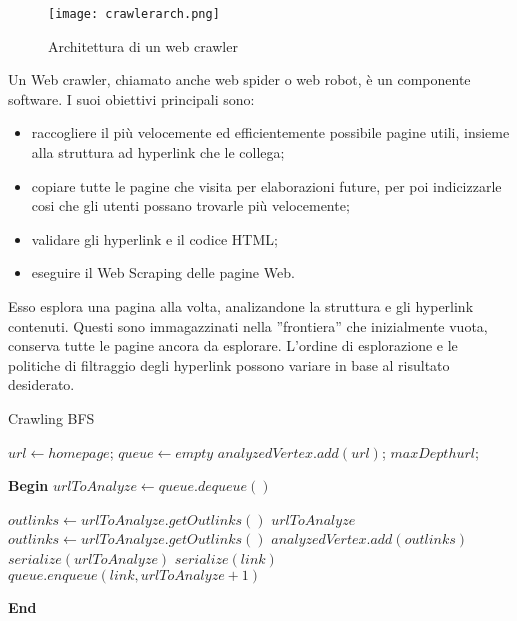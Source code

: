 \begin{figure}[htb]
	\centering
	\texttt{[image: crawlerarch.png]}
	\caption{Architettura di un web crawler}
	\label{crawlerarch}
\end{figure}

Un Web crawler, chiamato anche web spider o web robot, è un componente software. I suoi obiettivi principali sono:
\begin{itemize}
\item raccogliere il più velocemente ed efficientemente possibile pagine utili, insieme alla struttura ad hyperlink che le collega;
\item copiare tutte le pagine che visita per elaborazioni future, per poi indicizzarle cosi che gli utenti possano trovarle più velocemente;
\item validare gli hyperlink e il codice HTML;
\item eseguire il Web Scraping delle pagine Web.
\end{itemize}

Esso esplora una pagina alla volta, analizandone la struttura e gli hyperlink contenuti. Questi sono immagazzinati nella ''frontiera'' che inizialmente vuota, conserva tutte le pagine ancora da esplorare. L'ordine di esplorazione e le politiche di filtraggio degli hyperlink possono variare in base al risultato desiderato. 

\begin{algorithm}[H]
\caption{Crawling BFS}
\begin{algorithmic}

	\State $url\gets homepage$;	
	\State $queue\gets empty$ 
	\State $analyzedVertex.add(url)$;	
	\State $maxDepth url$;	
 	
 	\vspace*{+0.5cm}
 	
	\State \textbf{Begin}
		\State $urlToAnalyze\gets queue.dequeue()$
		
			\State $outlinks \gets urlToAnalyze.getOutlinks()$
		\Else
			\State $urlToAnalyze$
		\EndIf
			\State $outlinks \gets urlToAnalyze.getOutlinks()$
			\State $analyzedVertex.add(outlinks)$
			\State $serialize(urlToAnalyze)$
				\State $serialize(link)$
				\State $queue.enqueue(link, urlToAnalyze + 1)$
			\EndFor
		\EndIf
		
	\EndWhile
	\State \textbf{End}
\end{algorithmic}
\end{algorithm}

